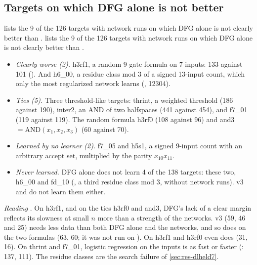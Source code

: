 \begin{table}[t]
\centering{\footnotesize\setlength{\tabcolsep}{3.5pt}
}
\caption{DFG alone against each reference, with the per-target ratios pooled over the suites where both were run (not a mean of suite means) . Columns as in \cref{tab:dlheld7-summ}. ``Only the reference'': DFG alone never reaches 10\% error and the reference does; ``only DFG'': the reverse. Bottom: DFG alone and v3 against  on the same 77 targets of the seven suites that Part 10 pooled as its held-out set; for DFG v1.3, only  among them is held out. Source:  (\texttt{q2\_suites.\_pooled}, \texttt{.\_pooled\_p10\_heldout}).}
\label{tab:pooled}
\end{table}

\subsection{Targets on which DFG alone is not better}\label{app:notwins}

 lists the 9 of the 126 targets with network runs on which DFG alone is not clearly better than  .
 lists the 9 of the 126 targets with network runs on which DFG alone is not clearly better than .
\begin{itemize}
\item \emph{Clearly worse (2).} h3rf1, a random 9-gate formula on 7 inputs: 133 against 101 (). And h6\_00, a residue class mod 3 of a signed 13-input count, which only the most regularized network learns (, 12304).
\item \emph{Ties (5).} Three threshold-like targets: thrint, a weighted threshold (186 against 190), inter2, an AND of two halfspaces (441 against 454), and f7\_01 (119 against 119). The random formula h3rf0 (108 against 96) and and3 $=\mathrm{AND}(x_1,x_2,x_3)$ (60 against 70).
\item \emph{Learned by no learner (2).} f7\_05 and h5s1, a signed 9-input count with an arbitrary accept set, multiplied by the parity $x_{10}x_{11}$.
\item \emph{Never learned.} DFG alone does not learn 4 of the 138 targets: these two, h6\_00 and fd\_10 (, a third residue class mod 3, without network runs). v3 and  do not learn them either.
\end{itemize}
\emph{Reading} . On h3rf1, and on the ties h3rf0 and and3, DFG's lack of a clear margin reflects its slowness at small $n$ more than a strength of the networks. v3 (59, 46 and 25) needs less data than both DFG alone and the networks, and so does  on the two formulas (63, 60; it was not run on ). On h3rf1 and h3rf0 even  does (31, 16). On thrint and f7\_01, logistic regression on the inputs is as fast or faster (: 137, 111). The residue classes are the search failure of \cref{sec:res-dlheld7}.

